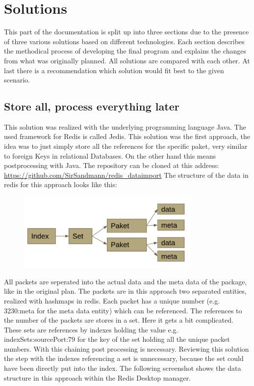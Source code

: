 \chapter{Solutions}
This part of the documentation is split up into three sections due to the presence of three various solutions based on different technologies. Each section describes the methodical process of developing the final program and explains the changes from what was originally planned. All solutions are compared with each other. At last there is a recommendation which solution would fit best to the given scenario. 

\section{Store all, process everything later}
This solution was realized with the underlying programming language Java. The used framework for Redis is called Jedis. This solution was the first approach, the idea was to just simply store all the references for the specific paket, very similar to foreign Keys in relational Databases. On the other hand this means postprocessing with Java. The repository can be cloned at this address:
\url{ https://github.com/SirSandmann/redis_dataimport}
The structure of the data in redis for this approach looks like this:

  \begin{figure}[htb!]
	\centerline{\includegraphics[width=0.8\textwidth]{resources/solution1-1.png}}
\end{figure}

All packets are seperated into the actual data and the meta data of the package, like in the original plan. The packets are in this approach two separated entities, realized with hashmaps in redis. Each packet has a unique number (e.g. 3230:meta for the meta data entity) which can be referenced. The references to the number of the packets are stores in a set. Here it gets a bit complicated. These sets are references by indexes holding the value e.g. indexSets:sourcePort:79 for the key of the set holding all the unique packet numbers. With this chaining post processing is necessary. Reviewing this solution the step with the indexes referencing a set is unnecessary, because the set could have been directly put into the index. The following screenshot shows the data structure in this approach within the Redis Desktop manager.

